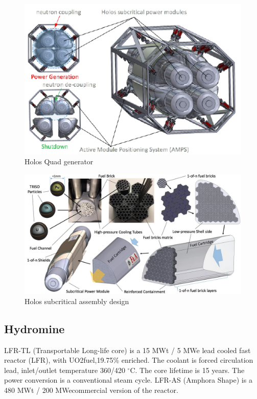 \begin{figure}[hbtp]
\centering
\includegraphics[scale=1]{Figs/holosquad.jpeg}
\caption{Holos Quad generator}
\label{Holosquad}
\end{figure}

\begin{figure}[hbtp]
\centering
\includegraphics[scale=0.3]{Figs/holosfueldesign.jpeg}
\caption{Holos subcritical assembly design}
\label{Holosdesign}
\end{figure}

\pagebreak

\subsection{Hydromine}
LFR-TL (Transportable Long-life core) is a 15 MWt / 5 MWe lead cooled fast reactor (LFR), with UO2fuel,19.75\% enriched. The coolant is forced circulation lead, inlet/outlet temperature 360/420 $^\circ{}$C. The core lifetime is 15 years. The power conversion is a conventional steam cycle. LFR-AS (Amphora Shape) is a 480 MWt / 200 MWecommercial version of the reactor.


